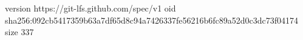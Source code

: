 version https://git-lfs.github.com/spec/v1
oid sha256:092cb5417359b63a7df65d8c94a7426337fe56216b6fc89a52d0c3dc73f04174
size 337
